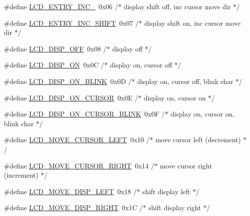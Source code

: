 \begin{DoxyCompactItemize}
\item 
\#define \hyperlink{group__pfleury__lcd_gad27ddc4b8d03594662c8757f946dde28}{L\+C\+D\+\_\+\+E\+N\+T\+R\+Y\+\_\+\+I\+N\+C\+\_\+}~0x06   /$\ast$ display shift off, inc cursor move dir $\ast$/
\item 
\#define \hyperlink{group__pfleury__lcd_gafabd0215cc6ae5539dc638dbec44a506}{L\+C\+D\+\_\+\+E\+N\+T\+R\+Y\+\_\+\+I\+N\+C\+\_\+\+S\+H\+I\+FT}~0x07   /$\ast$ display shift on,  inc cursor move dir $\ast$/
\item 
\#define \hyperlink{group__pfleury__lcd_gaa2966175115943883f51e9c90478540c}{L\+C\+D\+\_\+\+D\+I\+S\+P\+\_\+\+O\+FF}~0x08   /$\ast$ display off                            $\ast$/
\item 
\#define \hyperlink{group__pfleury__lcd_ga5163a96b133868975c0738e180b30cb8}{L\+C\+D\+\_\+\+D\+I\+S\+P\+\_\+\+ON}~0x0\+C   /$\ast$ display on, cursor off                 $\ast$/
\item 
\#define \hyperlink{group__pfleury__lcd_ga470cef85de53e37356b22c66a357a764}{L\+C\+D\+\_\+\+D\+I\+S\+P\+\_\+\+O\+N\+\_\+\+B\+L\+I\+NK}~0x0\+D   /$\ast$ display on, cursor off, blink char     $\ast$/
\item 
\#define \hyperlink{group__pfleury__lcd_gaf56b6d6bdb6fa48b26106dee5f74ae1f}{L\+C\+D\+\_\+\+D\+I\+S\+P\+\_\+\+O\+N\+\_\+\+C\+U\+R\+S\+OR}~0x0\+E   /$\ast$ display on, cursor on                  $\ast$/
\item 
\#define \hyperlink{group__pfleury__lcd_gac1984ed0db15c6991d34c184fdca5dc6}{L\+C\+D\+\_\+\+D\+I\+S\+P\+\_\+\+O\+N\+\_\+\+C\+U\+R\+S\+O\+R\+\_\+\+B\+L\+I\+NK}~0x0\+F   /$\ast$ display on, cursor on, blink char      $\ast$/
\item 
\#define \hyperlink{group__pfleury__lcd_gac2f0ddce1daaa1bf1a016270a89a264b}{L\+C\+D\+\_\+\+M\+O\+V\+E\+\_\+\+C\+U\+R\+S\+O\+R\+\_\+\+L\+E\+FT}~0x10   /$\ast$ move cursor left  (decrement)          $\ast$/
\item 
\#define \hyperlink{group__pfleury__lcd_ga0ad58e39e053e97d34527fcbe936899b}{L\+C\+D\+\_\+\+M\+O\+V\+E\+\_\+\+C\+U\+R\+S\+O\+R\+\_\+\+R\+I\+G\+HT}~0x14   /$\ast$ move cursor right (increment)          $\ast$/
\item 
\#define \hyperlink{group__pfleury__lcd_gab3c34ff1eee238bbe9c677215219fb8e}{L\+C\+D\+\_\+\+M\+O\+V\+E\+\_\+\+D\+I\+S\+P\+\_\+\+L\+E\+FT}~0x18   /$\ast$ shift display left                     $\ast$/
\item 
\#define \hyperlink{group__pfleury__lcd_ga9a90bb926f5ba59378af81fe8e246ffb}{L\+C\+D\+\_\+\+M\+O\+V\+E\+\_\+\+D\+I\+S\+P\+\_\+\+R\+I\+G\+HT}~0x1\+C   /$\ast$ shift display right                    $\ast$/

\end{DoxyCompactItemize}
